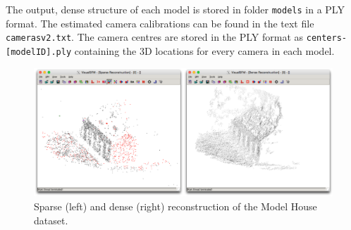 The output, dense structure of each model is stored in folder \texttt{models} in a PLY format. The estimated camera calibrations can be found in the text file \texttt{cameras\textunderscore v2.txt}. The camera centres are stored in the PLY format as  \texttt{centers-[model\textunderscore ID].ply} containing the 3D locations for every camera in each model.
\begin{figure}[h]
	\begin{center}
		\includegraphics[keepaspectratio,width=\textwidth]{fig/visualsfm-sparse-dense.pdf}
	\end{center}
	\caption{Sparse (left) and dense (right) reconstruction of the Model House dataset.}
	\label{fig:visualsfm-sparse-dense}
\end{figure}

